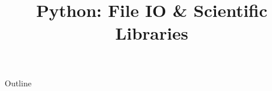 \documentclass[xcolor=dvipsnames,compress,t,pdf]{beamer}
\title[\insertframenumber /\inserttotalframenumber]{Python: File IO \& Scientific Libraries}
\begin{document}
	\begin{frame}
	\titlepage
	\end{frame}

	\begin{frame}{Outline}
	    \tableofcontents
	\end{frame}

	
	
	
\end{document}
